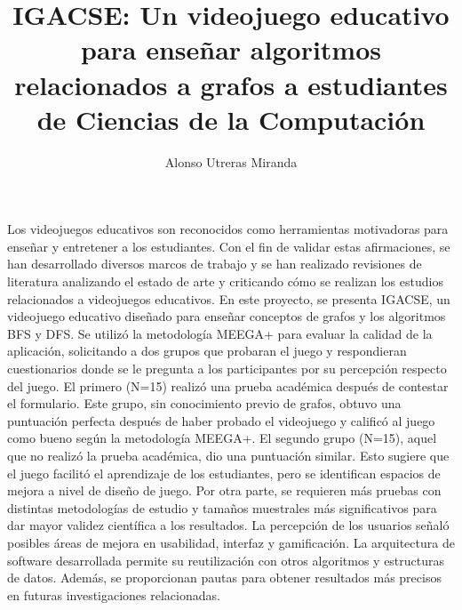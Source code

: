 \documentclass{umemoria}
\author{Alonso Utreras Miranda}
\title{IGACSE: Un videojuego educativo para enseñar algoritmos relacionados a grafos a estudiantes de Ciencias de la Computación}
\begin{document}
\frontmatter
\maketitle

\begin{resumen}
Los videojuegos educativos son reconocidos como herramientas motivadoras para enseñar y entretener a los estudiantes. Con el fin de validar estas afirmaciones, se han desarrollado diversos marcos de trabajo y se han realizado revisiones de literatura analizando el estado de arte y criticando cómo se realizan los estudios relacionados a videojuegos educativos. En este proyecto, se presenta IGACSE, un videojuego educativo diseñado para enseñar conceptos de grafos y los algoritmos BFS y DFS. Se utilizó la metodología MEEGA+  para evaluar la calidad de la aplicación, solicitando a dos grupos que probaran el juego y respondieran cuestionarios donde se le pregunta a los participantes por su percepción respecto del juego. El primero (N=15) realizó una prueba académica después de contestar el formulario. Este grupo, sin conocimiento previo de grafos, obtuvo una puntuación perfecta después de haber probado el videojuego y calificó al juego como bueno según la metodología MEEGA+. El segundo grupo (N=15), aquel que no realizó la prueba académica, dio una puntuación similar. Esto sugiere que el juego facilitó el aprendizaje de los estudiantes, pero se identifican espacios de mejora a nivel de diseño de juego. Por otra parte, se requieren más pruebas con distintas metodologías de estudio y tamaños muestrales más significativos para dar mayor validez científica a los resultados. La percepción de los usuarios señaló posibles áreas de mejora en usabilidad, interfaz y gamificación. La arquitectura de software desarrollada permite su reutilización con otros algoritmos y estructuras de datos. Además, se proporcionan pautas para obtener resultados más precisos en futuras investigaciones relacionadas.


\end{resumen}


\end{document}

